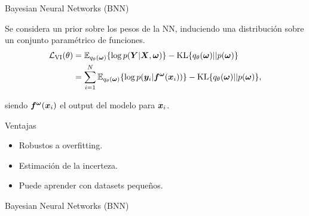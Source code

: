 \begin{frame}{Bayesian Neural Networks (BNN)}
    
    Se considera un prior sobre los pesos de la NN, induciendo una distribución sobre un conjunto paramétrico de funciones.
    \begin{align}
        \begin{split}
            \mathcal{L}_{\operatorname{VI}}(\theta) &= \mathbb{E}_{q_\theta({\bm{\omega}})}\{\log p({\bm{Y}}|{\bm{X}},{\bm{\omega}})\} - \operatorname{KL}\{q_\theta({\bm{\omega}})|| p({\bm{\omega}})\} \\
            &= \sum_{i=1}^N \mathbb{E}_{q_\theta({\bm{\omega}})}\{\log p({\bm{y}}_i|{\bm{f}}^{\bm{\omega}}({\bm{x}}_i))\} - \operatorname{KL}\{q_\theta({\bm{\omega}})|| p({\bm{\omega}})\},
        \end{split}
    \end{align}

    siendo ${\bm{f}}^{\bm{\omega}}({\bm{x}}_i)$ el output del modelo para ${\bm{x}}_i$.
    
    
    \begin{exampleblock}{Ventajas}
        \begin{itemize}
            \item Robustos a overfitting.
            \item Estimación de la incerteza.
            \item Puede aprender con datasets pequeños.
        \end{itemize}
    \end{exampleblock}
\end{frame}


\begin{frame}{Bayesian Neural Networks (BNN)}


   
    \vspace{10pt}
   
\end{frame}


